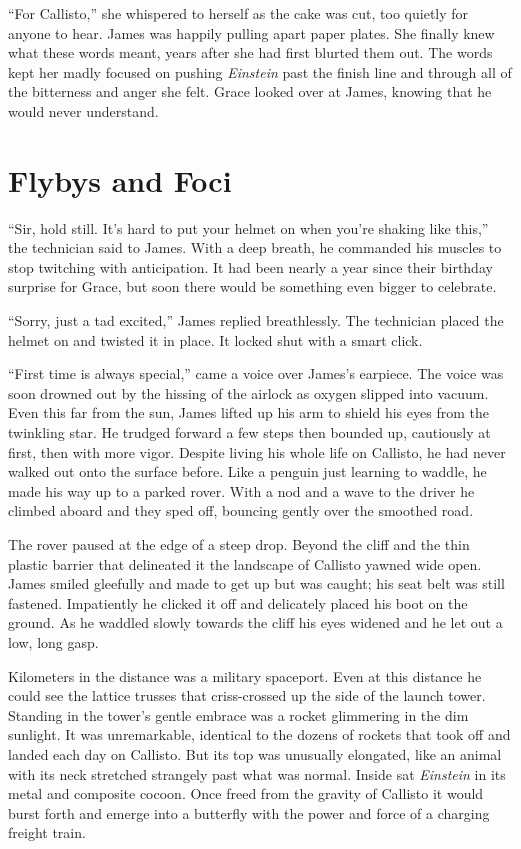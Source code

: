\documentclass[openany, 12pt]{book} %
\begin{document}
``For Callisto,'' she whispered to herself as the cake was cut, too quietly for anyone to hear. James was happily pulling apart paper plates. She finally knew what these words meant, years after she had first blurted them out. The words kept her madly focused on pushing \textit{Einstein} past the finish line and through all of the bitterness and anger she felt. Grace looked over at James, knowing that he would never understand.

\chapter{Flybys and Foci}

``Sir, hold still. It's hard to put your helmet on when you're shaking like this,'' the technician said to James. With a deep breath, he commanded his muscles to stop twitching with anticipation. It had been nearly a year since their birthday surprise for Grace, but soon there would be something even bigger to celebrate.

``Sorry, just a tad excited,'' James replied breathlessly. The technician placed the helmet on and twisted it in place. It locked shut with a smart click.

``First time is always special,'' came a voice over James's earpiece. The voice was soon drowned out by the hissing of the airlock as oxygen slipped into vacuum. Even this far from the sun, James lifted up his arm to shield his eyes from the twinkling star. He trudged forward a few steps then bounded up, cautiously at first, then with more vigor. Despite living his whole life on Callisto, he had never walked out onto the surface before. Like a penguin just learning to waddle, he made his way up to a parked rover. With a nod and a wave to the driver he climbed aboard and they sped off, bouncing gently over the smoothed road.

The rover paused at the edge of a steep drop. Beyond the cliff and the thin plastic barrier that delineated it the landscape of Callisto yawned wide open. James smiled gleefully and made to get up but was caught; his seat belt was still fastened. Impatiently he clicked it off and delicately placed his boot on the ground. As he waddled slowly towards the cliff his eyes widened and he let out a low, long gasp.

Kilometers in the distance was a military spaceport. Even at this distance he could see the lattice trusses that criss-crossed up the side of the launch tower. Standing in the tower's gentle embrace was a rocket glimmering in the dim sunlight. It was unremarkable, identical to the dozens of rockets that took off and landed each day on Callisto. But its top was unusually elongated, like an animal with its neck stretched strangely past what was normal. Inside sat \textit{Einstein} in its metal and composite cocoon. Once freed from the gravity of Callisto it would burst forth and emerge into a butterfly with the power and force of a charging freight train.
\end{document}

